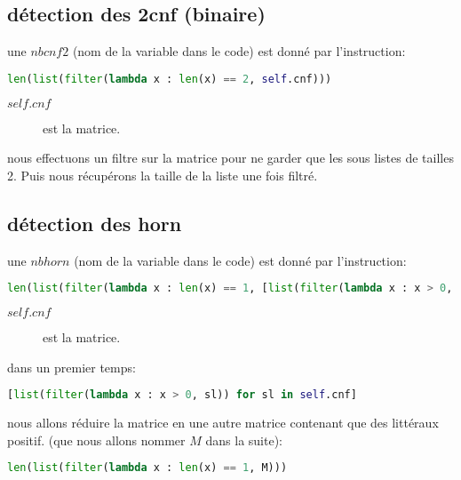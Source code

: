 \documentclass[french, 12pt]{report}
\begin{document}
\subsection{détection des 2cnf (binaire)}
une $nbcnf2$ (nom de la variable dans le code) est donné par l'instruction:
\begin{center}
\lstset{style=mlpythoncode}
\begin{lstlisting}[language=Python]
len(list(filter(lambda x : len(x) == 2, self.cnf)))
\end{lstlisting}
\end{center}

\begin{description}
\item[$self.cnf$] est la matrice.
\end{description}

nous effectuons un filtre sur la matrice pour ne garder que les sous listes de tailles 2. Puis nous récupérons la taille de la liste une fois filtré.\\

\pagebreak
\subsection{détection des horn}
une $nbhorn$ (nom de la variable dans le code) est donné par l'instruction:

\begin{center}
\lstset{style=mlpythoncode}
\begin{lstlisting}[language=Python]
len(list(filter(lambda x : len(x) == 1, [list(filter(lambda x : x > 0, sl)) for sl in self.cnf])))
\end{lstlisting}
\end{center}

\begin{description}
\item[$self.cnf$] est la matrice.
\end{description}

dans un premier temps:
\begin{center}
\lstset{style=mlpythoncode}
\begin{lstlisting}[language=Python]
[list(filter(lambda x : x > 0, sl)) for sl in self.cnf]
\end{lstlisting}
\end{center}

nous allons réduire la matrice en une autre matrice contenant que des littéraux positif. (que nous allons nommer $M$ dans la suite):
\begin{center}
\lstset{style=mlpythoncode}
\begin{lstlisting}[language=Python]
len(list(filter(lambda x : len(x) == 1, M)))
\end{lstlisting}
\end{center}
\end{document}
